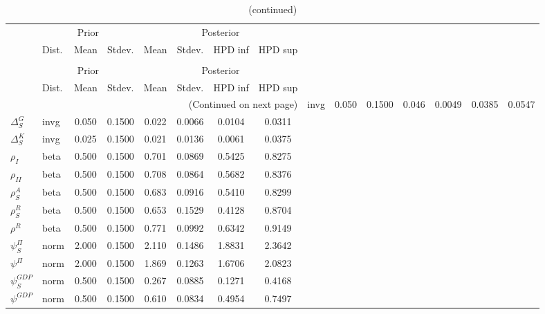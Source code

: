 
\begin{center}
\begin{longtable}{llcccccc} 
\caption{Results from Metropolis-Hastings (parameters)}
 \label{Table:MHPosterior:1}\\
\toprule 
  & \multicolumn{3}{c}{Prior}  &  \multicolumn{4}{c}{Posterior} \\
  \cmidrule(r{.75em}){2-4} \cmidrule(r{.75em}){5-8}
  & Dist. & Mean  & Stdev. & Mean & Stdev. & HPD inf & HPD sup\\
\midrule \endfirsthead 
\caption{(continued)}\\\toprule 
  & \multicolumn{3}{c}{Prior}  &  \multicolumn{4}{c}{Posterior} \\
  \cmidrule(r{.75em}){2-4} \cmidrule(r{.75em}){5-8}
  & Dist. & Mean  & Stdev. & Mean & Stdev. & HPD inf & HPD sup\\
\midrule \endhead 
\bottomrule \multicolumn{8}{r}{(Continued on next page)} \endfoot 
\bottomrule \endlastfoot 
${\Delta^{A}_{S}}$ & invg &   0.050 & 0.1500 &   0.046& 0.0049 &  0.0385 &  0.0547 \\ 
${\Delta^{G}_{S}}$ & invg &   0.050 & 0.1500 &   0.022& 0.0066 &  0.0104 &  0.0311 \\ 
${\Delta^{K}_{S}}$ & invg &   0.025 & 0.1500 &   0.021& 0.0136 &  0.0061 &  0.0375 \\ 
${\rho_{I}}$ & beta &   0.500 & 0.1500 &   0.701& 0.0869 &  0.5425 &  0.8275 \\ 
${\rho_{II}}$ & beta &   0.500 & 0.1500 &   0.708& 0.0864 &  0.5682 &  0.8376 \\ 
${\rho^{A}_{S}}$ & beta &   0.500 & 0.1500 &   0.683& 0.0916 &  0.5410 &  0.8299 \\ 
${\rho^{R}_{S}}$ & beta &   0.500 & 0.1500 &   0.653& 0.1529 &  0.4128 &  0.8704 \\ 
${\rho^{R}}$ & beta &   0.500 & 0.1500 &   0.771& 0.0992 &  0.6342 &  0.9149 \\ 
${\psi^{\Pi}_{S}}$ & norm &   2.000 & 0.1500 &   2.110& 0.1486 &  1.8831 &  2.3642 \\ 
${\psi^{\Pi}}$ & norm &   2.000 & 0.1500 &   1.869& 0.1263 &  1.6706 &  2.0823 \\ 
${\psi^{GDP}_{S}}$ & norm &   0.500 & 0.1500 &   0.267& 0.0885 &  0.1271 &  0.4168 \\ 
${\psi^{GDP}}$ & norm &   0.500 & 0.1500 &   0.610& 0.0834 &  0.4954 &  0.7497 \\ 
\end{longtable}
 \end{center}
